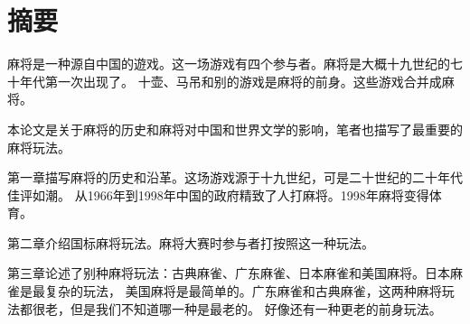 \chapter*{摘要}

麻将是一种源自中国的遊戏。这一场游戏有四个参与者。麻将是大概十九世纪的七十年代第一次出现了。
十壶、马吊和别的游戏是麻将的前身。这些游戏合并成麻将。

本论文是关于麻将的历史和麻将对中国和世界文学的影响，笔者也描写了最重要的麻将玩法。

第一章描写麻将的历史和沿革。这场游戏源于十九世纪，可是二十世纪的二十年代佳评如潮。
从1966年到1998年中国的政府精致了人打麻将。1998年麻将变得体育。

第二章介绍国标麻将玩法。麻将大赛时参与者打按照这一种玩法。

第三章论述了别种麻将玩法：古典麻雀、广东麻雀、日本麻雀和美国麻将。日本麻雀是最复杂的玩法，
美国麻将是最简单的。广东麻雀和古典麻雀，这两种麻将玩法都很老，但是我们不知道哪一种是最老的。
好像还有一种更老的前身玩法。